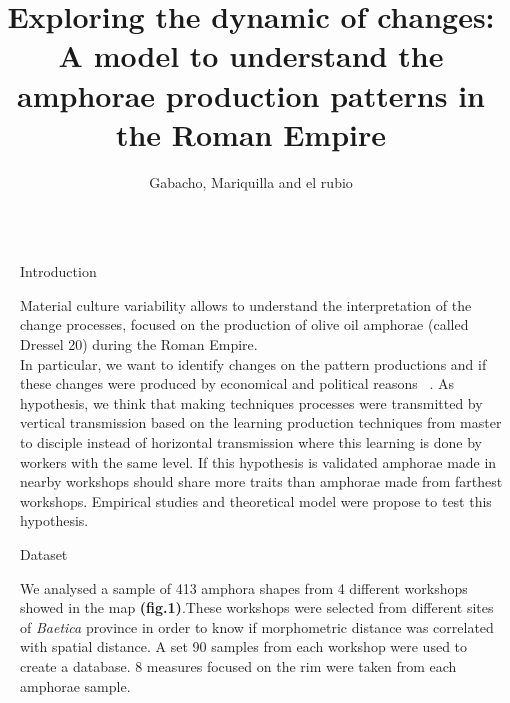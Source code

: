 \documentclass[final]{beamer}
\title{Exploring the dynamic of changes: A model to understand the amphorae production patterns in the Roman Empire} %
\author{Gabacho, Mariquilla and el rubio} %
\institute{Barcelona Supercomputing Center - University of Barcelona} %
\newlength{\sepwid}
\newlength{\onecolwid}
\begin{document}

\setlength{\belowcaptionskip}{2ex} %
\setlength\belowdisplayshortskip{2ex} %

\begin{frame}[t] %

\begin{columns}[t] %

\begin{column}{\sepwid}\end{column} %

\begin{column}{\onecolwid} %


\begin{block}{Introduction}

Material culture variability allows to understand the interpretation of the change processes, focused on the production of olive oil amphorae (called Dressel 20) during the Roman Empire. \\
In particular, we want to identify changes on the pattern productions and if these changes were produced by economical and political reasons ~\cite{schillinger}. As
hypothesis, we think that making techniques processes were transmitted by vertical transmission based on the learning production techniques from master to disciple instead of horizontal transmission where this learning is done by workers with the same level. If this hypothesis is validated amphorae made in nearby workshops should share more traits than amphorae made from farthest workshops. Empirical studies and theoretical model were propose to test this hypothesis. 
\end{block}


\begin{block}{Dataset}


We analysed a sample of 413 amphora shapes from 4 different workshops showed in the map \textbf{(fig.1)}.These workshops were selected from different sites of \emph{Baetica} province in order to know if morphometric distance was correlated with spatial distance. A set 90 samples from each workshop were used to create a database. 8 measures focused on the rim were taken from each amphorae sample. 


\end{block}
\end{column}
\end{columns}
\end{frame}
\end{document}
